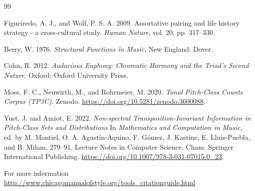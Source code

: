 \documentclass[twoside,onecolumn]{article}
\begin{document}
\begin{thebibliography}{99} %

Figueiredo, A. J., and Wolf, P. S. A. 2009.
\newblock Assortative pairing and life history strategy - a cross-cultural
  study.
\newblock \textit {Human Nature}, vol. 20, pp. 317--330.

Berry, W. 1976.
\newblock \textit {Structural Functions in Music}.
\newblock New England: Dover.

Cohn, R. 2012. 
\newblock \textit{Audacious Euphony: Chromatic Harmony and the Triad's Second Nature}. 
\newblock Oxford: Oxford University Press.

Moss, F. C., Neuwirth, M., and Rohrmeier, M. 2020. \textit{Tonal Pitch-Class Counts Corpus (TP3C)}. Zenodo. \url{https://doi.org/10.5281/zenodo.3600088}.

Yust, J. and Amiot, E. 2022. 
\newblock \textit {Non-spectral Transposition-Invariant Information in Pitch-Class Sets and Distributions}
\newblock In \textit{Mathematics and Computation in Music}, ed. by M. Montiel, O. A. Agustín-Aquino, F. Gómez, J. Kastine, E. Lluis-Puebla, and B. Milam, 279--91. Lecture Notes in Computer Science. Cham: Springer International Publishing. \url{https://doi.org/10.1007/978-3-031-07015-0_23}.


 
\end{thebibliography}

\noindent For more information \url{http://www.chicagomanualofstyle.org/tools_citationguide.html}

\end{document}
